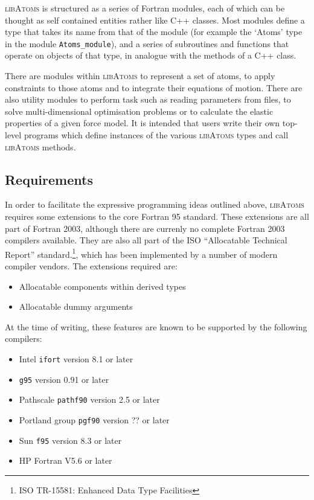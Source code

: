 \textsc{libAtoms} is structured as a series of Fortran modules, each of which
can be thought as self contained entities rather like C++ classes. Most
modules define a type that takes its name from that of the module
(for example the `Atoms' type in the module \texttt{Atoms\_module}),
and a series of subroutines and functions that operate on objects
of that type, in analogue with the methods of a C++ class.

There are modules within \textsc{libAtoms} to represent a set of
atoms, to apply constraints to those atoms and to integrate their
equations of motion. There are also utility modules to perform task
such as reading parameters from files, to solve multi-dimensional
optimisation problems or to calculate the elastic properties of a
given force model. It is intended that users write their own top-level
programs which define instances of the various \textsc{libAtoms} types
and call \textsc{libAtoms} methods.

\subsection*{Requirements}

In order to facilitate the expressive programming ideas outlined
above, \textsc{libAtoms} requires some extensions to the core Fortran
95 standard. These extensions are all part of Fortran 2003, although
there are currenly no complete Fortran 2003 compilers available. They
are also all part of the ISO ``Allocatable Technical Report''
standard.\footnote{ISO TR-15581: Enhanced Data Type Facilities}, which
has been implemented by a number of modern compiler vendors. The
extensions required are:
\begin{itemize}
\item Allocatable components within derived types
\item Allocatable dummy arguments
\end{itemize}

At the time of writing, these features are known to be
supported by the following compilers:
\begin{itemize}
\item Intel \texttt{ifort} version 8.1 or later
\item \texttt{g95} version 0.91 or later
\item Pathscale \texttt{pathf90} version 2.5 or later
\item Portland group \texttt{pgf90} version ?? or later
\item Sun \texttt{f95} version 8.3 or later
\item HP Fortran V5.6 or later
\end{itemize}


